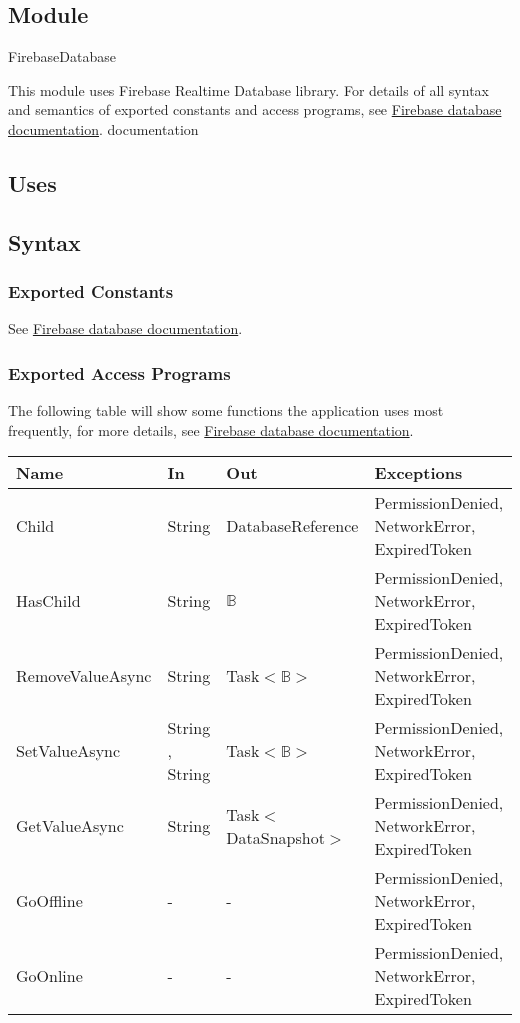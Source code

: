 \documentclass[12pt, titlepage]{article}
\begin{document}
\begin{itemize}
\subsection{Module}

FirebaseDatabase

\noindent This module uses Firebase Realtime Database library. For details of all syntax and semantics of exported constants and access programs, see \href{https://firebase.google.com/docs/reference/unity/namespace/firebase/database}{Firebase database documentation}.
documentation
\subsection{Uses}

\subsection{Syntax}

\subsubsection{Exported Constants}
See \href{https://firebase.google.com/docs/reference/unity/namespace/firebase/database}{Firebase database documentation}.
\subsubsection{Exported Access Programs}
The following table will show some functions the application uses most frequently, for more details, see \href{https://firebase.google.com/docs/reference/unity/namespace/firebase/database}{Firebase database documentation}.
\begin{center}
\begin{tabular}{p{4cm} p{2cm} p{4cm} p{4cm}}
\hline
\textbf{Name} & \textbf{In} & \textbf{Out} & \textbf{Exceptions} \\
\hline
Child & String & DatabaseReference & PermissionDenied, NetworkError, ExpiredToken \\
HasChild & String & $\mathbb{B}$ & PermissionDenied, NetworkError, ExpiredToken \\
RemoveValueAsync & String & Task$<\mathbb{B}>$ & PermissionDenied,  NetworkError,  ExpiredToken \\
SetValueAsync & String , String & Task$<\mathbb{B}>$ & PermissionDenied,  NetworkError,  ExpiredToken \\
GetValueAsync & String & Task$<$DataSnapshot$>$ & PermissionDenied, NetworkError,  ExpiredToken \\
GoOffline & - & - & PermissionDenied, NetworkError,  ExpiredToken \\
GoOnline & - & - & PermissionDenied, NetworkError,  ExpiredToken \\
\hline
\end{tabular}
\end{center}


\end{itemize}
\end{document}
